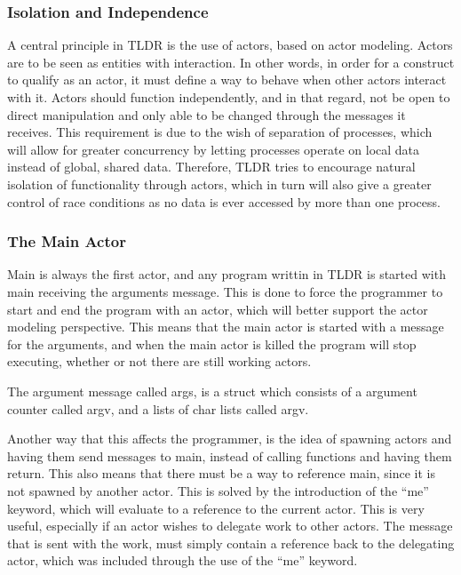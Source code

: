 \subsubsection{Isolation and Independence}

A central principle in TLDR is the use of actors, based on actor modeling. Actors are to be seen as entities with interaction. In other words, in order for a construct to qualify as an actor, it must define a way to behave when other actors interact with it. Actors should function independently, and in that regard, not be open to direct manipulation and only able to be changed through the messages it receives. This requirement is due to the wish of separation of processes, which will allow for greater concurrency by letting processes operate on local data instead of global, shared data. Therefore, TLDR tries to encourage natural isolation of functionality through actors, which in turn will also give a greater control of race conditions as no data is ever accessed by more than one process.

\subsubsection{The Main Actor}

Main is always the first actor, and any program writtin in TLDR is started with main receiving the arguments message. This is done to force the programmer to start and end the program with an actor, which will better support the actor modeling perspective. This means that the main actor is started with a message for the arguments, and when the main actor is killed the program will stop executing, whether or not there are still working actors.

The argument message called args, is a struct which consists of a argument counter called argv, and a lists of char lists called argv.

Another way that this affects the programmer, is the idea of spawning actors and having them send messages to main, instead of calling functions and having them return. This also means that there must be a way to reference main, since it is not spawned by another actor. This is solved by the introduction of the \enquote{me} keyword, which will evaluate to a reference to the current actor. This is very useful, especially if an actor wishes to delegate work to other actors. The message that is sent with the work, must simply contain a reference back to the delegating actor, which was included through the use of the \enquote{me} keyword.

